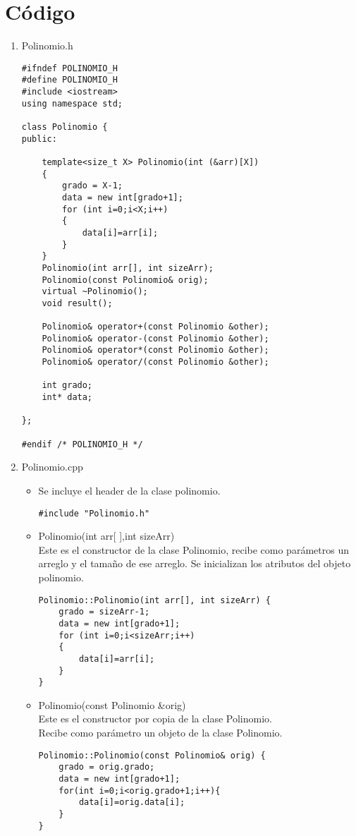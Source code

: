 \documentclass[11pt]{article}
\begin{document}
\section{C\'odigo}
\begin{enumerate}
\item Polinomio.h
\begin{lstlisting}
#ifndef POLINOMIO_H
#define POLINOMIO_H
#include <iostream>
using namespace std;

class Polinomio {
public:

    template<size_t X> Polinomio(int (&arr)[X])
    {
        grado = X-1;
        data = new int[grado+1];
        for (int i=0;i<X;i++)
        {
            data[i]=arr[i];
        }
    }
    Polinomio(int arr[], int sizeArr);
    Polinomio(const Polinomio& orig);
    virtual ~Polinomio();
    void result();

    Polinomio& operator+(const Polinomio &other);
    Polinomio& operator-(const Polinomio &other);
    Polinomio& operator*(const Polinomio &other);
    Polinomio& operator/(const Polinomio &other);
    
    int grado;
    int* data;
    
};

#endif /* POLINOMIO_H */

\end{lstlisting}

\item Polinomio.cpp
\begin{itemize}
\item Se incluye el header de la clase polinomio.
\begin{lstlisting}
#include "Polinomio.h"
\end{lstlisting}

\item Polinomio(int arr[ ],int sizeArr)\\
Este es el constructor de la clase Polinomio, recibe como par\'ametros un arreglo y el tama\~no de ese arreglo.
Se inicializan los atributos del objeto polinomio.\\
\begin{lstlisting}
Polinomio::Polinomio(int arr[], int sizeArr) {
    grado = sizeArr-1;
    data = new int[grado+1];
    for (int i=0;i<sizeArr;i++)
    {
        data[i]=arr[i];
    }
}
\end{lstlisting}

\item Polinomio(const Polinomio \&orig)\\
Este es el constructor por copia de la clase Polinomio.\\
Recibe como par\'ametro un objeto de la clase Polinomio. 
\begin{lstlisting}
Polinomio::Polinomio(const Polinomio& orig) {
    grado = orig.grado;
    data = new int[grado+1];
    for(int i=0;i<orig.grado+1;i++){
        data[i]=orig.data[i];
    }
}
\end{lstlisting}


\end{itemize}
\end{enumerate}
\end{document}
